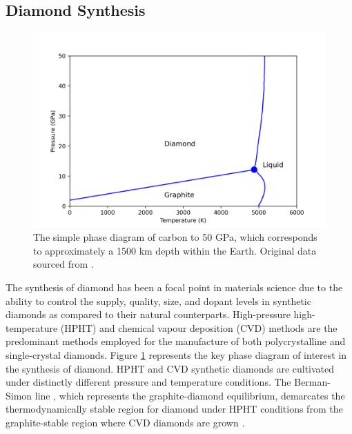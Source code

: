\begin{refsection}
\subsection{Diamond Synthesis}
\begin{figure}
	\centering
	\includegraphics[width=\linewidth]{Chapter2/Figs/Raster/HDphase.png}
	\caption{The simple phase diagram of carbon to 50 \si{\giga\pascal}, which corresponds to approximately a 1500 \si{\kilo\metre} depth within the Earth. Original data sourced from \cite{blank:2018}.}
	\label{fig:phase11}
\end{figure}
The synthesis of diamond has been a focal point in materials science due to the ability to control the supply, quality, size, and dopant levels in synthetic diamonds as compared to their natural counterparts. High-pressure high-temperature (HPHT) and chemical vapour deposition (CVD) methods are the predominant methods employed for the manufacture of both polycrystalline and single-crystal diamonds. Figure \ref{fig:phase11} represents the key phase diagram of interest in the synthesis of diamond. HPHT and CVD synthetic diamonds are cultivated under distinctly different pressure and temperature conditions. The Berman-Simon line \cite{Bundy1961}, which represents the graphite-diamond equilibrium, demarcates the thermodynamically stable region for diamond under HPHT conditions from the graphite-stable region where CVD diamonds are grown \cite{Bovenkerk1993}.


\end{refsection}
